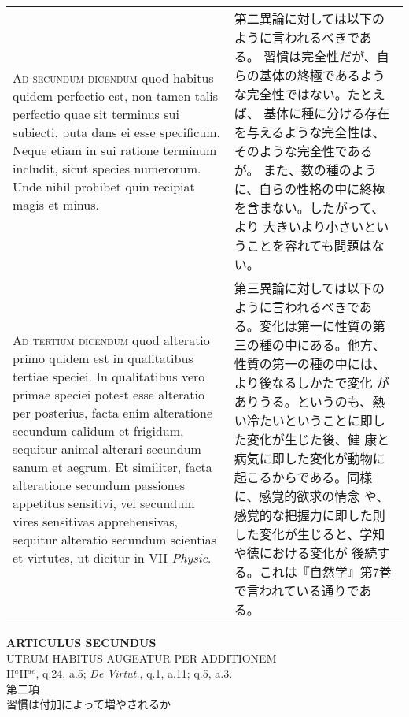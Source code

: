 \documentclass[10pt]{jsarticle} %
\begin{document}
\begin{longtable}{p{21em}p{21em}}
{\scshape Ad secundum dicendum} quod habitus quidem perfectio est, non tamen
talis perfectio quae sit terminus sui subiecti, puta dans ei esse
specificum. Neque etiam in sui ratione terminum includit, sicut
species numerorum. Unde nihil prohibet quin recipiat magis et minus.

&

第二異論に対しては以下のように言われるべきである。
習慣は完全性だが、自らの基体の終極であるような完全性ではない。たとえば、
 基体に種に分ける存在を与えるような完全性は、そのような完全性であるが。
また、数の種のように、自らの性格の中に終極を含まない。したがって、より
 大きいより小さいということを容れても問題はない。

\\


{\scshape Ad tertium dicendum} quod alteratio primo quidem est in qualitatibus
tertiae speciei. In qualitatibus vero primae speciei potest esse
alteratio per posterius, facta enim alteratione secundum calidum et
frigidum, sequitur animal alterari secundum sanum et aegrum. Et
similiter, facta alteratione secundum passiones appetitus sensitivi,
vel secundum vires sensitivas apprehensivas, sequitur alteratio
secundum scientias et virtutes, ut dicitur in VII {\itshape Physic}.
&

第三異論に対しては以下のように言われるべきである。変化は第一に性質の第
三の種の中にある。他方、性質の第一の種の中には、より後なるしかたで変化
がありうる。というのも、熱い冷たいということに即した変化が生じた後、健
康と病気に即した変化が動物に起こるからである。同様に、感覚的欲求の情念
や、感覚的な把握力に即した則した変化が生じると、学知や徳における変化が
後続する。これは『自然学』第7巻で言われている通りである。


\end{longtable}
\newpage


\begin{center}
{\Large {\bf ARTICULUS SECUNDUS}}\\
{\large UTRUM HABITUS AUGEATUR PER ADDITIONEM}\\
{\footnotesize II$^{a}$II$^{ae}$, q.24, a.5; {\itshape De Virtut.},
 q.1, a.11; q.5, a.3.}\\
{\Large 第二項\\習慣は付加によって増やされるか}
\end{center}
\end{document}
